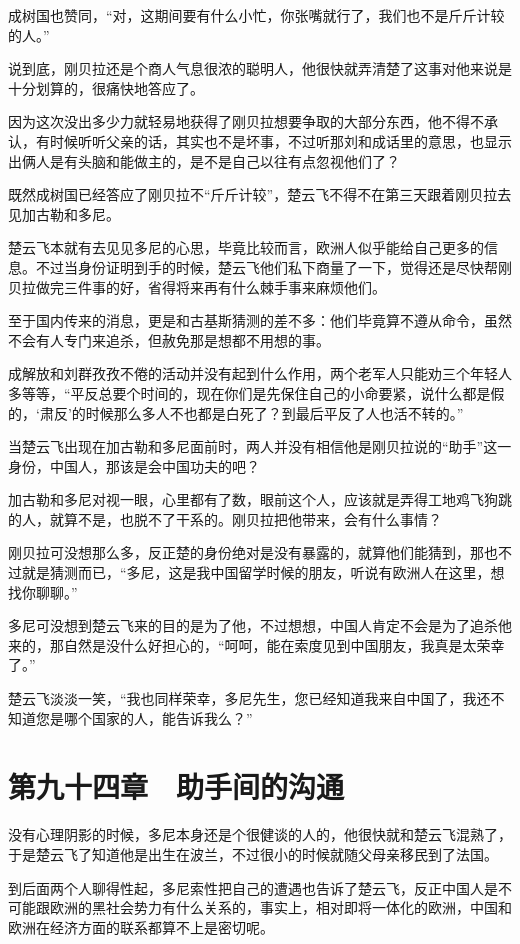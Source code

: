 成树国也赞同，“对，这期间要有什么小忙，你张嘴就行了，我们也不是斤斤计较的人。”

说到底，刚贝拉还是个商人气息很浓的聪明人，他很快就弄清楚了这事对他来说是十分划算的，很痛快地答应了。

因为这次没出多少力就轻易地获得了刚贝拉想要争取的大部分东西，他不得不承认，有时候听听父亲的话，其实也不是坏事，不过听那刘和成话里的意思，也显示出俩人是有头脑和能做主的，是不是自己以往有点忽视他们了？

既然成树国已经答应了刚贝拉不“斤斤计较”，楚云飞不得不在第三天跟着刚贝拉去见加古勒和多尼。

楚云飞本就有去见见多尼的心思，毕竟比较而言，欧洲人似乎能给自己更多的信息。不过当身份证明到手的时候，楚云飞他们私下商量了一下，觉得还是尽快帮刚贝拉做完三件事的好，省得将来再有什么棘手事来麻烦他们。

至于国内传来的消息，更是和古基斯猜测的差不多：他们毕竟算不遵从命令，虽然不会有人专门来追杀，但赦免那是想都不用想的事。

成解放和刘群孜孜不倦的活动并没有起到什么作用，两个老军人只能劝三个年轻人多等等，“平反总要个时间的，现在你们是先保住自己的小命要紧，说什么都是假的，‘肃反’的时候那么多人不也都是白死了？到最后平反了人也活不转的。”

当楚云飞出现在加古勒和多尼面前时，两人并没有相信他是刚贝拉说的“助手”这一身份，中国人，那该是会中国功夫的吧？

加古勒和多尼对视一眼，心里都有了数，眼前这个人，应该就是弄得工地鸡飞狗跳的人，就算不是，也脱不了干系的。刚贝拉把他带来，会有什么事情？

刚贝拉可没想那么多，反正楚的身份绝对是没有暴露的，就算他们能猜到，那也不过就是猜测而已，“多尼，这是我中国留学时候的朋友，听说有欧洲人在这里，想找你聊聊。”

多尼可没想到楚云飞来的目的是为了他，不过想想，中国人肯定不会是为了追杀他来的，那自然是没什么好担心的，“呵呵，能在索度见到中国朋友，我真是太荣幸了。”

楚云飞淡淡一笑，“我也同样荣幸，多尼先生，您已经知道我来自中国了，我还不知道您是哪个国家的人，能告诉我么？”

\section{第九十四章　助手间的沟通}

没有心理阴影的时候，多尼本身还是个很健谈的人的，他很快就和楚云飞混熟了，于是楚云飞了知道他是出生在波兰，不过很小的时候就随父母亲移民到了法国。

到后面两个人聊得性起，多尼索性把自己的遭遇也告诉了楚云飞，反正中国人是不可能跟欧洲的黑社会势力有什么关系的，事实上，相对即将一体化的欧洲，中国和欧洲在经济方面的联系都算不上是密切呢。

